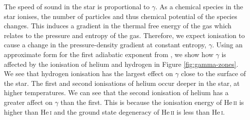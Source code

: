 The speed of sound in the star is proportional to \(\gamma\). As a chemical species in the star ionises, the number of particles and thus chemical potential of the species changes. This induces a gradient in the thermal free energy of the gas which relates to the pressure and entropy of the gas. Therefore, we expect ionisation to cause a change in the pressure-density gradient at constant entropy, \(\gamma\). Using an approximate form for the first adiabatic exponent from \citet{Houdayer.Reese.ea2021}, we show how \(\gamma\) is affected by the ionisation of helium and hydrogen in Figure \ref{fig:gamma-zones}. We see that hydrogen ionisation has the largest effect on \(\gamma\) close to the surface of the star. The first and second ionisations of helium occur deeper in the star, at higher temperatures. We can see that the second ionisation of helium has a greater affect on \(\gamma\) than the first. This is because the ionisation energy of He\,\textsc{ii} is higher than He\,\textsc{i} and the ground state degeneracy of He\,\textsc{ii} is less than He\,\textsc{i}.

